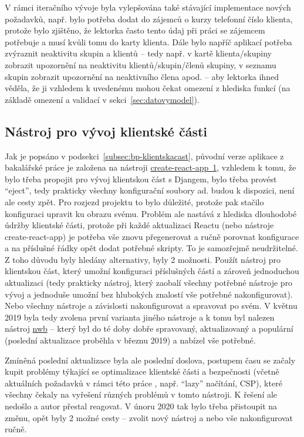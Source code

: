 V rámci iteračního vývoje byla vylepšována také stávající implementace nových požadavků, např. bylo potřeba dodat do zájemců o kurzy telefonní číslo klienta, protože bylo zjištěno, že lektorka často tento údaj při práci se zájemcem potřebuje a musí kvůli tomu do karty klienta. Dále bylo napříč aplikací potřeba zvýraznit neaktivitu skupin a klientů -- tedy např. v kartě klienta/skupiny zobrazit upozornění na neaktivitu klientů/skupin/členů skupiny, v seznamu skupin zobrazit upozornění na neaktivního člena apod. -- aby lektorka ihned věděla, že ji vzhledem k uvedenému mohou čekat omezení z hlediska funkcí (na základě omezení a validací v sekci~\ref{sec:datovymodel}).

\subsection{Nástroj pro vývoj klientské části}\label{subsec:nastrojprovyvojklientskecasti}

Jak je popsáno v podsekci~\ref{subsec:bp-klientskacast}, původní verze aplikace z bakalářské práce je založena na nástroji \href{https://github.com/facebook/create-react-app}{create-react-app~1}, vzhledem k tomu, že bylo třeba propojit pro vývoj klientskou část s Djangem, bylo třeba provést \enquote{eject}, tedy prakticky všechny konfigurační soubory ad. budou k dispozici, není ale cesty zpět. Pro rozjezd projektu to bylo důležité, protože pak stačilo konfiguraci upravit ku obrazu svému. Problém ale nastává z hlediska dlouhodobé údržby klientské části, protože při každé aktualizaci Reactu (nebo nástroje create-react-app) je potřeba vše znovu přegenerovat a ručně porovnat konfigurace a na příslušné řádky opět dodat potřebné skripty. To je samozřejmě neudržitelné. Z toho důvodu byly hledány alternativy, byly 2 možnosti. Použít nástroj pro klientskou část, který umožní konfiguraci příslušných částí a zároveň jednoduchou aktualizaci (tedy prakticky nástroj, který zaobalí všechny potřebné nástroje pro vývoj a jednoduše umožní bez hlubokých znalostí vše potřebné nakonfigurovat). Nebo všechny nástroje a závislosti nakonfigurovat a spravovat po svém. V květnu 2019 byla tedy zvolena první varianta jiného nástroje a k tomu byl nalezen nástroj \href{https://github.com/insin/nwb}{nwb} -- který byl do té doby dobře spravovaný, aktualizovaný a populární (poslední aktualizace proběhla v březnu 2019) a nabízel vše potřebné.

Zmíněná poslední aktualizace byla ale poslední doslova, postupem času se začaly kupit problémy týkající se optimalizace klientské části a bezpečnosti (včetně aktuálních požadavků v rámci této práce , např. \enquote{lazy} načítání, CSP), které všechny čekaly na vyřešení různých problémů v tomto nástroji. K řešení ale nedošlo a autor přestal reagovat. V únoru 2020 tak bylo třeba přistoupit na změnu, opět byly 2 možné cesty -- zvolit nový nástroj a nebo vše nakonfigurovat ručně.

